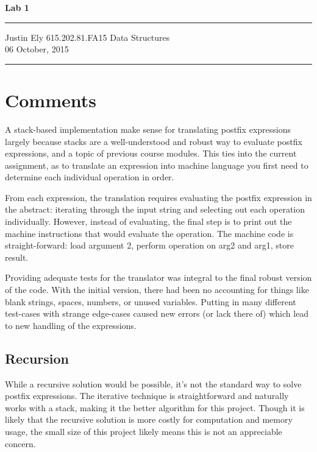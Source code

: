 \documentclass[a4paper,12pt]{article}
\begin{document}
\begin{flushright}

\vspace{1.1cm}

{\bf\Huge Lab 1}

\rule{0.25\linewidth}{0.5pt}

\vspace{0.5cm}
Justin Ely
\linebreak
\newline
\footnotesize{615.202.81.FA15 Data Structures \\}
\vspace{0.5cm}
06 October, 2015
\end{flushright}

\noindent\rule{\linewidth}{1.0pt}


\section{Comments}
A stack-based implementation make sense for translating postfix expressions largely because stacks are a well-understood
and robust way to evaluate postfix expressions, and a topic of previous course modules.  This ties into the current assignment, as to translate an expression into machine 
language you first need to determine each individual operation in order.  

From each expression, the translation requires evaluating the postfix expression in the abstract: iterating through the input string and selecting out each operation individually.  However, instead of evaluating, the final step is to print out the machine instructions that would evaluate the operation.  The machine code is straight-forward: load argument 2, perform operation on arg2 and arg1, store result.  

Providing adequate tests for the translator was integral to the final robust version of the code.  With the initial version, there had been no 
accounting for things like blank strings, spaces, numbers, or unused variables.  Putting in many different test-cases with strange edge-cases caused
new errors (or lack there of) which lead to new handling of the expressions.

\subsection{Recursion}
While a recursive solution would be possible, it's not the standard way to solve postfix expressions.  The iterative technique
is straightforward and naturally works with a stack, making it the better algorithm for this project.  Though it is likely that the recursive 
solution is more costly for computation and memory usage, the small size of this project likely means this is not an appreciable 
concern.
\end{document}
